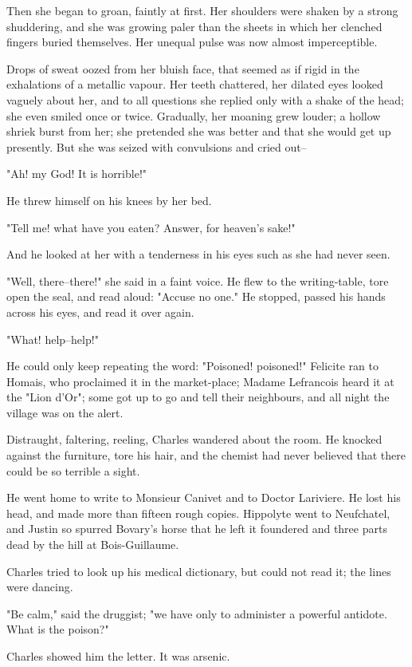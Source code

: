 \documentclass[11pt,twocolumn]{ltugboat}
\begin{document}
Then she began to groan, faintly at first. Her shoulders were shaken by
a strong shuddering, and she was growing paler than the sheets in which
her clenched fingers buried themselves. Her unequal pulse was now almost
imperceptible.

Drops of sweat oozed from her bluish face, that seemed as if rigid in
the exhalations of a metallic vapour. Her teeth chattered, her dilated
eyes looked vaguely about her, and to all questions she replied only
with a shake of the head; she even smiled once or twice. Gradually, her
moaning grew louder; a hollow shriek burst from her; she pretended she
was better and that she would get up presently. But she was seized with
convulsions and cried out--

"Ah! my God! It is horrible!"

He threw himself on his knees by her bed.

"Tell me! what have you eaten? Answer, for heaven's sake!"

And he looked at her with a tenderness in his eyes such as she had never
seen.

"Well, there--there!" she said in a faint voice. He flew to the
writing-table, tore open the seal, and read aloud: "Accuse no one." He
stopped, passed his hands across his eyes, and read it over again.

"What! help--help!"

He could only keep repeating the word: "Poisoned! poisoned!" Felicite
ran to Homais, who proclaimed it in the market-place; Madame Lefrancois
heard it at the "Lion d'Or"; some got up to go and tell their
neighbours, and all night the village was on the alert.

Distraught, faltering, reeling, Charles wandered about the room. He
knocked against the furniture, tore his hair, and the chemist had never
believed that there could be so terrible a sight.

He went home to write to Monsieur Canivet and to Doctor Lariviere. He
lost his head, and made more than fifteen rough copies. Hippolyte went
to Neufchatel, and Justin so spurred Bovary's horse that he left it
foundered and three parts dead by the hill at Bois-Guillaume.

Charles tried to look up his medical dictionary, but could not read it;
the lines were dancing.

"Be calm," said the druggist; "we have only to administer a powerful
antidote. What is the poison?"

Charles showed him the letter. It was arsenic.
\end{document}
